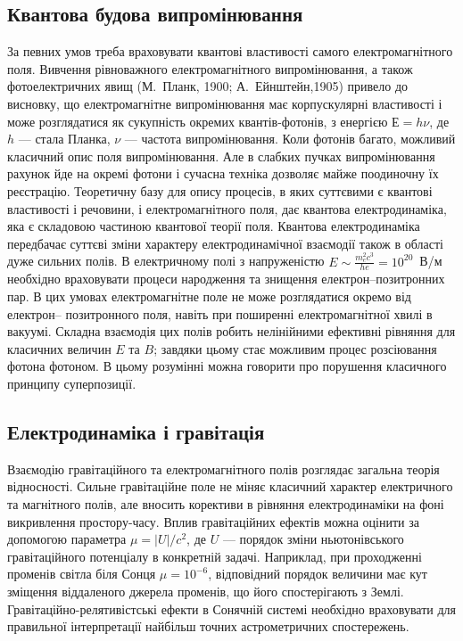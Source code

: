\subsection*{Квантова будова випромінювання}

За певних умов треба враховувати квантові властивості самого електромагнітного поля. Вивчення рівноважного електромагнітного випромінювання, а також
фотоелектричних явищ (М.~Планк, 1900; А.~Ейнштейн,1905) привело до висновку, що електромагнітне випромінювання має корпускулярні властивості і може
розглядатися як сукупність окремих квантів-фотонів, з енергією $Е=h\nu$, де $h$ --- стала Планка, $\nu$ --- частота випромінювання. Коли фотонів багато,
можливий класичний опис поля випромінювання. Але в слабких пучках випромінювання рахунок йде на окремі фотони і сучасна техніка дозволяє майже
поодиночну їх реєстрацію. Теоретичну базу для опису процесів, в яких суттєвими є квантові властивості і речовини, і електромагнітного поля, дає квантова
електродинаміка, яка є складовою частиною квантової теорії поля. Квантова електродинаміка передбачає суттєві зміни характеру електродинамічної взаємодії
також в області дуже сильних полів. В електричному полі з напруженістю $E \sim \frac{m_e^2 c^3}{he} = 10^{20}$~В/м необхідно враховувати процеси
народження та знищення електрон–позитронних пар. В цих умовах електромагнітне поле не може розглядатися окремо від електрон– позитронного поля, навіть
при поширенні електромагнітної хвилі в вакуумі. Складна взаємодія цих полів робить нелінійними ефективні рівняння для класичних величин $E$ та $B$;
завдяки цьому стає можливим процес розсіювання фотона фотоном. В цьому розумінні можна говорити про порушення класичного принципу суперпозиції.



\subsection*{Електродинаміка і гравітація}

Взаємодію гравітаційного та електромагнітного полів розглядає загальна
теорія відносності. Сильне гравітаційне поле не міняє класичний характер
електричного та магнітного полів, але вносить корективи в рівняння
електродинаміки на фоні викривлення простору-часу. Вплив гравітаційних
ефектів можна оцінити за допомогою параметра $\mu = |U|/c^2$, де $U$ --- порядок
зміни ньютонівського гравітаційного потенціалу в конкретній задачі.
Наприклад, при проходженні променів світла біля Сонця $\mu = 10^{-6}$, відповідний
порядок величини має кут зміщення віддаленого джерела променів, що його
спостерігають з Землі. Гравітаційно-релятивістські ефекти в Сонячній системі
необхідно враховувати для правильної інтерпретації найбільш точних
астрометричних спостережень.

